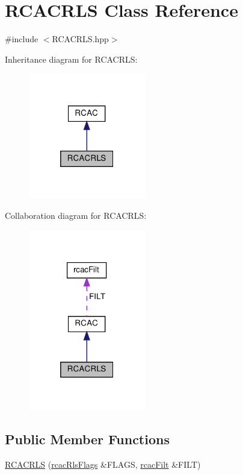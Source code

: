 \hypertarget{class_r_c_a_c_r_l_s}{}\section{R\+C\+A\+C\+R\+LS Class Reference}
\label{class_r_c_a_c_r_l_s}


{\ttfamily \#include $<$R\+C\+A\+C\+R\+L\+S.\+hpp$>$}



Inheritance diagram for R\+C\+A\+C\+R\+LS\+:\nopagebreak
\begin{figure}[H]
\begin{center}
\leavevmode
\includegraphics[width=145pt]{class_r_c_a_c_r_l_s__inherit__graph}
\end{center}
\end{figure}


Collaboration diagram for R\+C\+A\+C\+R\+LS\+:\nopagebreak
\begin{figure}[H]
\begin{center}
\leavevmode
\includegraphics[width=145pt]{class_r_c_a_c_r_l_s__coll__graph}
\end{center}
\end{figure}
\subsection*{Public Member Functions}
\begin{DoxyCompactItemize}
\item 
\hyperlink{class_r_c_a_c_r_l_s_aaac6f50062f37e04d10c40ba55063324}{R\+C\+A\+C\+R\+LS} (\hyperlink{structrcac_rls_flags}{rcac\+Rls\+Flags} \&F\+L\+A\+GS, \hyperlink{structrcac_filt}{rcac\+Filt} \&F\+I\+LT)
\end{DoxyCompactItemize}
